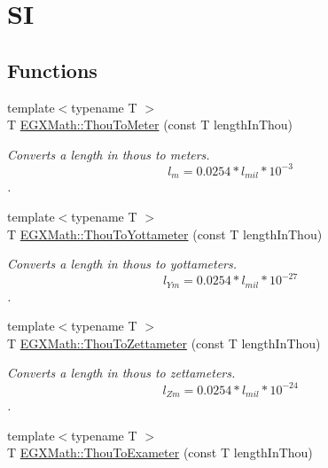 \hypertarget{group___e_g_x_math-_conversions-_length_conversions-_imperial-_thou-_s_i}{}\section{SI}
\label{group___e_g_x_math-_conversions-_length_conversions-_imperial-_thou-_s_i}
\subsection*{Functions}
\begin{DoxyCompactItemize}
\item 
{\footnotesize template$<$typename T $>$ }\\T \mbox{\hyperlink{group___e_g_x_math-_conversions-_length_conversions-_imperial-_thou-_s_i_ga0d5d19b317eee7fc8c2a4c24195e8ed5}{E\+G\+X\+Math\+::\+Thou\+To\+Meter}} (const T length\+In\+Thou)
\begin{DoxyCompactList}\small\item\em Converts a length in thous to meters. \[ l_{m}=0.0254 * l_{mil} * 10^{-3} \]. \end{DoxyCompactList}\item 
{\footnotesize template$<$typename T $>$ }\\T \mbox{\hyperlink{group___e_g_x_math-_conversions-_length_conversions-_imperial-_thou-_s_i_ga289b200bab4328ce7bcde4464d91c62a}{E\+G\+X\+Math\+::\+Thou\+To\+Yottameter}} (const T length\+In\+Thou)
\begin{DoxyCompactList}\small\item\em Converts a length in thous to yottameters. \[ l_{Ym}=0.0254 * l_{mil} * 10^{-27} \]. \end{DoxyCompactList}\item 
{\footnotesize template$<$typename T $>$ }\\T \mbox{\hyperlink{group___e_g_x_math-_conversions-_length_conversions-_imperial-_thou-_s_i_ga388e6005a2fec0fb3e52db46841eacef}{E\+G\+X\+Math\+::\+Thou\+To\+Zettameter}} (const T length\+In\+Thou)
\begin{DoxyCompactList}\small\item\em Converts a length in thous to zettameters. \[ l_{Zm}=0.0254 * l_{mil} * 10^{-24} \]. \end{DoxyCompactList}\item 
{\footnotesize template$<$typename T $>$ }\\T \mbox{\hyperlink{group___e_g_x_math-_conversions-_length_conversions-_imperial-_thou-_s_i_ga727138bc2a5fb18f959a675df44b6306}{E\+G\+X\+Math\+::\+Thou\+To\+Exameter}} (const T length\+In\+Thou)

\end{DoxyCompactItemize}
